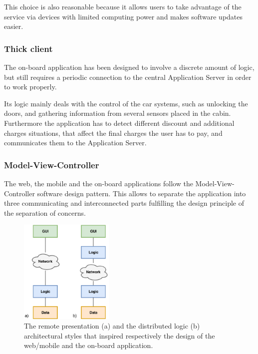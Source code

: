 This choice is also reasonable because it allows users to take advantage of the service via devices with limited computing power and makes software updates easier.

\subsubsection{Thick client}
The on-board application has been designed to involve a discrete amount of logic, but still requires a periodic connection to the central Application Server in order to work properly.

Its logic mainly deals with the control of the car systems, such as unlocking the doors, and gathering information from several sensors placed in the cabin. Furthermore the application has to detect different discount and additional charges situations, that affect the final charges the user has to pay, and communicates them to the Application Server.

\subsubsection{Model-View-Controller}
The web, the mobile and the on-board applications follow the Model-View-Controller software design pattern. This allows to separate the application into three communicating and interconnected parts fulfilling the design principle of the separation of concerns.

\begin{figure}[H]
\begin{center}
		\includegraphics[width=0.4\textwidth]{./arch_design/diagrams/architectural_patterns.png}
		\caption{The remote presentation (a) and the distributed logic (b) architectural styles that inspired respectively the design of the web/mobile and the on-board application.}
		\label{arch_patterns}
\end{center}
\end{figure}